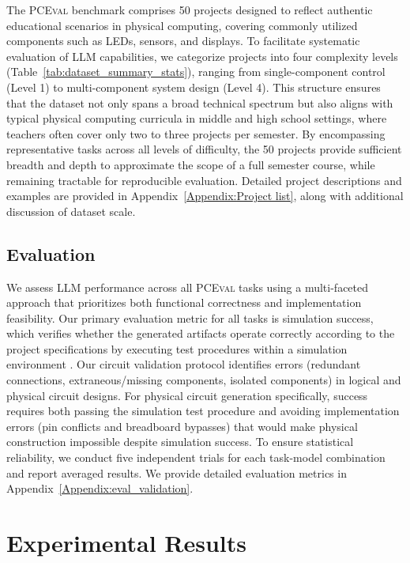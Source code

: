 \documentclass{article} %
\begin{document}
The \textsc{PCEval} benchmark comprises 50 projects designed to reflect authentic educational scenarios in physical computing, covering commonly utilized components such as LEDs, sensors, and displays. 
To facilitate systematic evaluation of LLM capabilities, we categorize projects into four complexity levels (Table~\ref{tab:dataset_summary_stats}), ranging from single-component control (Level 1) to multi-component system design (Level 4). 
This structure ensures that the dataset not only spans a broad technical spectrum but also aligns with typical physical computing curricula in middle and high school settings, where teachers often cover only two to three projects per semester. 
By encompassing representative tasks across all levels of difficulty, the 50 projects provide sufficient breadth and depth to approximate the scope of a full semester course, while remaining tractable for reproducible evaluation. 
Detailed project descriptions and examples are provided in Appendix~\ref{Appendix:Project list}, along with additional discussion of dataset scale.





\subsection{Evaluation}
We assess LLM performance across all \textsc{PCEval} tasks using a multi-faceted approach that prioritizes both functional correctness and implementation feasibility.
Our primary evaluation metric for all tasks is simulation success, which verifies whether the generated artifacts operate correctly according to the project specifications by executing test procedures within a simulation environment \citep{shaked2020wokwi}.
Our circuit validation protocol identifies errors (redundant connections, extraneous/missing components, isolated components) in logical and physical circuit designs.
For physical circuit generation specifically, success requires both passing the simulation test procedure and avoiding implementation errors (pin conflicts and breadboard bypasses) that would make physical construction impossible despite simulation success.
To ensure statistical reliability, we conduct five independent trials for each task-model combination and report averaged results.
We provide detailed evaluation metrics in Appendix~\ref{Appendix:eval_validation}.


\section{Experimental Results}
\end{document}
